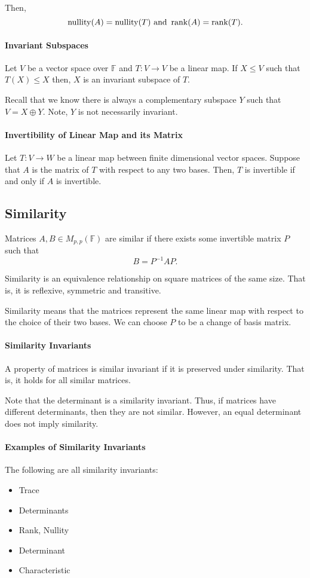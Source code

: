 Then, \[
    \mathrm{nullity}(A) = \mathrm{nullity}(T) \text{ and } \rank(A) = \rank(T)
.\]

\paragraph{Invariant Subspaces}
Let \(V\) be a vector space over \( \mathbb{F} \) and \(T: V\to V\)
be a linear map.
If \(X \leq V\) such that \(T(X) \leq X\) then, \(X\) is an invariant
subspace of \(T\).

Recall that we know there is always a complementary subspace \(Y\)
such that \(V = X \oplus Y\).
Note, \(Y\) is not necessarily invariant.

\paragraph{Invertibility of Linear Map and its Matrix}
Let \( T: V \to W \) be a linear map between finite dimensional vector spaces.
Suppose that \( A \) is the matrix of \( T \) with respect to any two bases.
Then, \( T \) is invertible if and only if \( A \) is invertible.

\subsection{Similarity}

Matrices \( A, B \in M_{p, p}(\mathbb{F}) \) are similar if there exists
some invertible matrix \( P \) such that \[
    B = P^{-1} A P.
\]

Similarity is an equivalence relationship on square matrices of the same size.
That is, it is reflexive, symmetric and transitive.

Similarity means that the matrices represent the same linear map with
respect to the choice of their two bases.
We can choose \( P \) to be a change of basis matrix.

\paragraph{Similarity Invariants}
A property of matrices is similar invariant if it is preserved under similarity.
That is, it holds for all similar matrices.

Note that the determinant is a similarity invariant. Thus, if matrices
have different determinants, then they are not similar.
However, an equal determinant does not imply similarity.


\paragraph{Examples of Similarity Invariants}
The following are all similarity invariants:
\begin{itemize}
    \item Trace
    \item Determinants
    \item Rank, Nullity
    \item Determinant
    \item Characteristic
\end{itemize}


